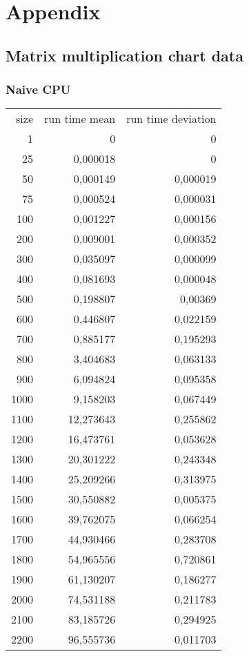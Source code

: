 \section{Appendix}

\subsection{Matrix multiplication chart data}
\label{sec:matrix_mul_chart_data}

\subsubsection{Naive CPU}

\begin{tabular}{r r r}
size & run time mean & run time deviation \\
1 & 0 & 0 \\
25 & 0,000018 & 0 \\
50 & 0,000149 & 0,000019 \\
75 & 0,000524 & 0,000031 \\
100 & 0,001227 & 0,000156 \\
200 & 0,009001 & 0,000352 \\
300 & 0,035097 & 0,000099 \\
400 & 0,081693 & 0,000048 \\
500 & 0,198807 & 0,00369 \\
600 & 0,446807 & 0,022159 \\
700 & 0,885177 & 0,195293 \\
800 & 3,404683 & 0,063133 \\
900 & 6,094824 & 0,095358 \\
1000 & 9,158203 & 0,067449 \\
1100 & 12,273643 & 0,255862 \\
1200 & 16,473761 & 0,053628 \\
1300 & 20,301222 & 0,243348 \\
1400 & 25,209266 & 0,313975 \\
1500 & 30,550882 & 0,005375 \\
1600 & 39,762075 & 0,066254 \\
1700 & 44,930466 & 0,283708 \\
1800 & 54,965556 & 0,720861 \\
1900 & 61,130207 & 0,186277 \\
2000 & 74,531188 & 0,211783 \\
2100 & 83,185726 & 0,294925 \\
2200 & 96,555736 & 0,011703 \\

\end{tabular}
